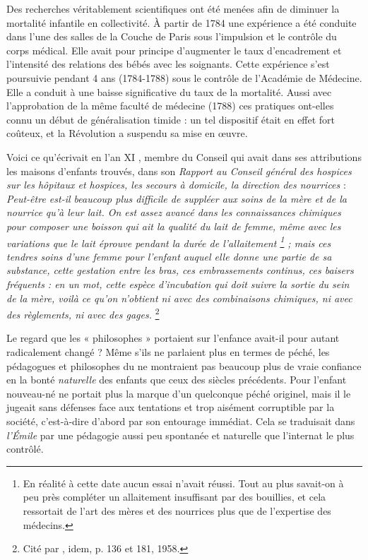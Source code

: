  Des recherches véritablement scientifiques ont été menées afin de diminuer la mortalité infantile en collectivité. À partir de 1784 une expérience a été conduite dans l'une des salles de la Couche de Paris sous l'impulsion et le contrôle du corps médical. Elle avait pour principe d'augmenter le taux d'encadrement et l'intensité des relations des bébés avec les soignants. Cette expérience s'est poursuivie pendant 4 ans (1784-1788) sous le contrôle de l'Académie de Médecine. Elle a conduit à une baisse significative du taux de la mortalité. Aussi avec l'approbation de la même faculté de médecine (1788) ces pratiques ont-elles connu un début de généralisation timide : un tel dispositif était en effet fort coûteux, et la Révolution a suspendu sa mise en œuvre.

 Voici ce qu'écrivait en l'an XI , membre du Conseil qui avait dans ses attributions les maisons d'enfants trouvés, dans son \emph{Rapport au Conseil général des hospices sur les hôpitaux et hospices, les secours à domicile, la direction des nourrices} : \emph{Peut-être est-il beaucoup plus difficile de suppléer aux soins de la mère et de la nourrice qu'à leur lait. On est assez avancé dans les connaissances chimiques pour composer une boisson qui ait la qualité du lait de femme, même avec les variations que le lait éprouve pendant la durée de l'allaitement%
\footnote{En réalité à cette date aucun essai n'avait réussi. Tout au plus savait-on à peu près compléter un allaitement insuffisant par des bouillies, et cela ressortait de l'art des mères et des nourrices plus que de l'expertise des médecins.} 
; mais ces tendres soins d'une femme pour l'enfant auquel elle donne une partie de sa substance, cette gestation entre les bras, ces embrassements continus, ces baisers fréquents : en un mot, cette espèce d'incubation qui doit suivre la sortie du sein de la mère, voilà ce qu'on n'obtient ni avec des combinaisons chimiques, ni avec des règlements, ni avec des gages.}%
\footnote{Cité par , idem, p. 136 et 181, 1958.} 

Le regard que les « {philosophes} » portaient sur l'enfance avait-il pour autant radicalement changé ? Même s'ils ne parlaient plus en termes de péché, les pédagogues et philosophes du  ne montraient pas beaucoup plus de vraie confiance en la bonté \emph{naturelle} des enfants que ceux des siècles précédents. Pour  l'enfant nouveau-né ne portait plus la marque d'un quelconque péché originel, mais il le jugeait sans défenses face aux tentations et trop aisément corruptible par la société, c'est-à-dire d'abord par son entourage immédiat. Cela se traduisait dans \emph{l'Émile} par une pédagogie aussi peu spontanée et naturelle que l'internat le plus contrôlé. 
 
